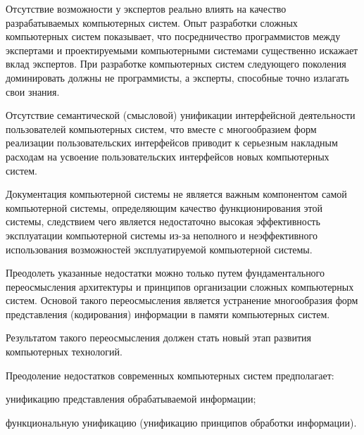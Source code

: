 \begin{SCn}
{\begin{scnenumerate}
\item Отсутствие возможности у экспертов реально влиять на качество разрабатываемых компьютерных систем. Опыт разработки сложных компьютерных систем показывает, что посредничество программистов между экспертами и проектируемыми компьютерными системами существенно искажает вклад экспертов. При разработке компьютерных систем следующего поколения доминировать должны не программисты, а эксперты, способные точно излагать свои знания.

\item Отсутствие семантической (смысловой) унификации интерфейсной деятельности пользователей компьютерных систем, что вместе с многообразием форм реализации пользовательских интерфейсов приводит к серьезным накладным расходам на усвоение пользовательских интерфейсов новых компьютерных систем.

\item Документация компьютерной системы не является важным компонентом самой компьютерной системы, определяющим качество функционирования этой системы, следствием чего является недостаточно высокая эффективность эксплуатации компьютерной системы из-за неполного и неэффективного использования возможностей эксплуатируемой компьютерной системы.
\end{scnenumerate}

Преодолеть указанные недостатки можно только путем фундаментального переосмысления архитектуры и принципов организации сложных компьютерных систем. Основой такого переосмысления является устранение многообразия форм представления (кодирования) информации в памяти компьютерных систем.

Результатом такого переосмысления должен стать новый этап развития компьютерных технологий.

Преодоление недостатков современных компьютерных систем предполагает:
\begin{scnitemize}
\item унификацию представления обрабатываемой информации;
\item функциональную унификацию (унификацию принципов обработки информации).
\end{scnitemize}}

\end{SCn}
